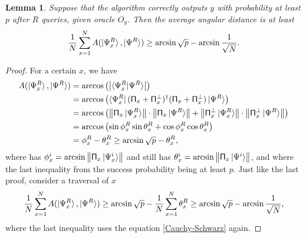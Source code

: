 \documentclass[a4paper,10pt]{book}
\newtheorem{lemma}{Lemma}[section]
\numberwithin{equation}{section}
\begin{document}
\begin{lemma}
    Suppose that the algorithm correctly outputs $y$ with probability at least $p$ after $R$ queries, given oracle $O_{y}$. Then the average angular distance is at least
    \begin{equation}
        \frac{1}{N}\sum_{x=1}^{N}A(\ket{\Psi_{x}^{R}},\ket{\Psi^{R}})\geq \arcsin\sqrt{p}-\arcsin\frac{1}{\sqrt{N}}.
    \end{equation}
\end{lemma}
\begin{proof}
    For a certain $x$, we have
    \begin{equation*}
        \begin{split}
            A(\ket{\Psi_{x}^{R}},\ket{\Psi^{R}})
             & = \arccos\left(\left\lvert \braket{\Psi_{x}^{R}|\Psi^{R}}\right\rvert\right)                                                                                                                                                                  \\
             & = \arccos\left(\bra{\Psi_{x}^{R}}(\mathsf{\Pi}_{x}+\mathsf{\Pi}_{x}^{\perp})^{\dagger}(\mathsf{\Pi}_{x}+\mathsf{\Pi}_{x}^{\perp})\ket{\Psi^{R}}\right)                                                                                        \\
             & = \arccos\left(\left\|\mathsf{\Pi}_{x}\ket{\Psi_{x}^{R}}\right\|\cdot\left\|\mathsf{\Pi}_{x}\ket{\Psi^{R}}\right\|+\left\|\mathsf{\Pi}_{x}^{\perp}\ket{\Psi_{x}^{R}}\right\|\cdot\left\|\mathsf{\Pi}_{x}^{\perp}\ket{\Psi^{R}}\right\|\right) \\
             & = \arccos\left(\sin\phi_{x}^{R}\sin\theta_{x}^{R}+\cos\phi_{x}^{R}\cos\theta_{x}^{R}\right)                                                                                                                                                   \\
             & = \phi_{x}^{R}-\theta_{x}^{R} \geq \arcsin\sqrt{p}-\theta_{x}^{R},
        \end{split}
    \end{equation*}
    where has $\phi_{x}^{i}=\arcsin\left\| \mathsf{\Pi}_{x}\ket{\Psi_{x}^{i}}\right\|$ and still has $\theta_{x}^{i}=\arcsin\left\| \mathsf{\Pi}_{x}\ket{\Psi^{i}}\right\|$, and where the last inequality from the success probability being at least $p$. Just like the last proof, consider a traversal of $x$
    \begin{equation*}
        \frac{1}{N}\sum_{x=1}^{N}A(\ket{\Psi_{x}^{R}},\ket{\Psi^{R}})
        \geq \arcsin\sqrt{p}-\frac{1}{N}\sum_{x=1}^{N}\theta_{x}^{R}
        \geq \arcsin\sqrt{p}-\arcsin\frac{1}{\sqrt{N}},
    \end{equation*}
    where the last inequality uses the equation \ref{Cauchy-Schwarz} again.
\end{proof}
\end{document}
